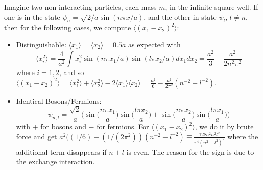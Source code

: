 \documentclass[a4paper]{article}
\begin{document}
\begin{eg}
Imagine two non-interacting particles, each mass $m$, in the infinite square well. If one is in the state $\psi_n=\sqrt{2/a}\sin(n\pi x/a)$, and the other in state $\psi_l$, $l\neq n$, then for the following cases, we compute $\langle (x_1-x_2)^2\rangle$:
\begin{itemize}
    \item Distinguishable: $\langle x_1\rangle=\langle x_2\rangle=0.5a$ as expected with
    $$\langle x_i^2\rangle=\frac{4}{a^2}\int x_i^2\sin(n\pi x_1/a)\sin(l\pi x_2/a)dx_1dx_2=\frac{a^2}{3}-\frac{a^2}{2n^2\pi^2}$$
    where $i=1,2$, and so $\langle (x_1-x_2)^2\rangle=\langle x_1^2\rangle+\langle x_2^2\rangle-2\langle x_1\rangle\langle x_2\rangle=\frac{a^2}{6}-\frac{a^2}{2\pi^2}(n^{-2}+l^{-2})$.
    \item Identical Bosons/Fermions:
    $$\psi_{n,l}=\frac{\sqrt{2}}{a}\bigg(\sin\bigg(\frac{n\pi x_1}{a}\bigg)\sin\bigg(\frac{l\pi x_2}{a}\bigg)\pm\sin\bigg(\frac{n\pi x_2}{a}\bigg)\sin\bigg(\frac{l\pi x_1}{a}\bigg)\bigg)$$
    with $+$ for bosons and $-$ for fermions. For $\langle(x_1-x_2)^2\rangle$, we do it by brute force and get $a^2((1/6)-(1/(2\pi^2))(n^{-2}+l^{-2})\mp\frac{128a^2n^2l^2}{\pi^4(n^2-l^2)^2}$ where the additional term disappears if $n+l$ is even. The reason for the sign is due to the exchange interaction.
\end{itemize}
\end{eg}
\end{document}
